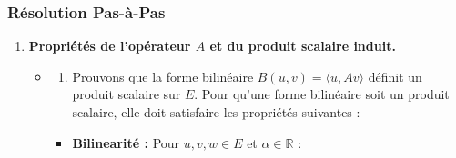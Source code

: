 \documentclass[11pt,a4paper]{report}
\begin{document}
\hypertarget{ruxe9solution-pas-uxe0-pas}{%
\subsubsection{Résolution Pas-à-Pas}\label{ruxe9solution-pas-uxe0-pas}}

\begin{enumerate}
\def\labelenumi{\arabic{enumi}.}

\item
  \textbf{Propriétés de l'opérateur \(A\) et du produit scalaire
  induit.}

  \begin{itemize}
  \item
    \begin{enumerate}
    \def\labelenumii{\alph{enumii})}

    \item
      Prouvons que la forme bilinéaire
      \(B(u,v) = \langle u, Av \rangle\) définit un produit scalaire sur
      \(E\). Pour qu'une forme bilinéaire soit un produit scalaire, elle
      doit satisfaire les propriétés suivantes :
    \end{enumerate}

    \begin{itemize}

    \item
      \textbf{Bilinearité :} Pour \(u, v, w \in E\) et
      \(\alpha \in \mathbb{R}\) :

      \begin{itemize}


\end{itemize}
\end{itemize}
\end{itemize}
\end{enumerate}
\end{document}
